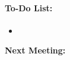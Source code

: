 \documentclass{article}
\begin{document}
\vspace{1cm}
\paragraph{\LARGE To-Do List: }


	\begin{itemize}
		\item\textbf{ }\\
		
			
	\end{itemize}
	
	
\vspace{1cm}

\begin {center}
{\Large \textbf{Next Meeting: }}
\end{center}
\end{document}
